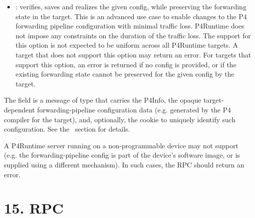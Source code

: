 \documentclass[11pt]{article}
\begin{document}
{\begin{itemize}
\item{}
: verifies, saves and realizes the given config, while
preserving the forwarding state in the target. This is an advanced use case to
enable changes to the P4 forwarding pipeline configuration with minimal
traffic loss. P4Runtime does not impose any constraints on the duration of the
traffic loss. The support for this option is not expected to be uniform across
all P4Runtime targets. A target that does not support this option may return
an  error. For targets that support this option, an
 error is returned if no config is provided, or if the
existing forwarding state cannot be preserved for the given config by the
target.%
\end{itemize}%

\noindent{}The  field is a message of type  that carries
the P4Info, the opaque target-dependent forwarding-pipeline configuration data
(e.g. generated by the P4 compiler for the target), and, optionally, the cookie
to uniquely identify such configuration. See the~ section for details.%

A P4Runtime server running on a non-programmable device may not
support  (e.g. the forwarding-pipeline
config is part of the device's software image, or is supplied using a
different mechanism). In such cases, the RPC should return an
 error.%

\section{15.\hspace*{0.5em} RPC}\label{sec-getforwardingpipelineconfig-rpc}%

}
\end{document}
